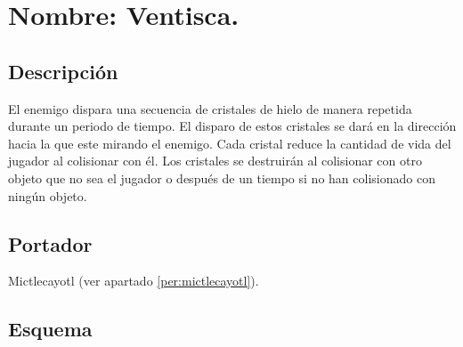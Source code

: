 \section{Nombre: Ventisca.} \label{ventisca}
\subsection{Descripción}
El enemigo dispara una secuencia de cristales de hielo de manera repetida durante un periodo de tiempo. El disparo de estos cristales se dará en la dirección hacia la que este mirando el enemigo. Cada cristal reduce la cantidad de vida del jugador al colisionar con él. Los cristales se destruirán al colisionar con otro objeto que no sea el jugador o después de un tiempo si no han colisionado con ningún objeto.
\subsection{Portador}
Mictlecayotl (ver apartado \ref{per:mictlecayotl}).
\subsection{Esquema}
			